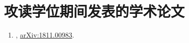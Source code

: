 \chapter*{攻读学位期间发表的学术论文}
\thispagestyle{fancy}


\begin{enumerate}
\item \textbf{}, \href{https://arxiv.org/pdf/1811.00983.pdf}{arXiv:1811.00983}.
\end{enumerate}